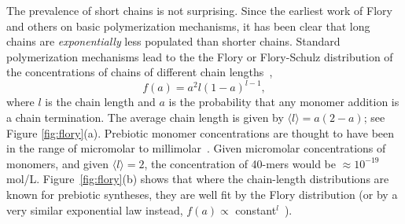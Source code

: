 \documentclass[5p,times]{elsarticle}
\begin{document}
The prevalence of short chains is not surprising.  Since the earliest work of Flory and others 
on basic polymerization mechanisms, it has been clear that long chains are \textit{exponentially} 
less populated than shorter chains.  
Standard polymerization mechanisms lead to the the Flory or Flory-Schulz distribution of the 
concentrations of chains of different chain lengths~\cite{Flory1953}, 
\begin{equation}
 f(a)=a^2l(1-a)^{l-1},\label{eq:flory}
\end{equation} 
where $l$ is the chain length and $a$ is the probability that any monomer addition is a chain 
termination.  The average chain length is given by $\langle l \rangle = a(2- a)$; see Figure 
\ref{fig:flory}(a).  Prebiotic monomer concentrations are thought to have been in the range of 
micromolar to millimolar~\cite{Stribling1987,Huber1998,Aubrey2009,Kanavarioti2001,Lazcano1996}.  
Given micromolar concentrations of monomers, and given $\langle l \rangle = 2$, the concentration 
of 40-mers would be $\approx 10^{-19} $ mol/L.  Figure~\ref{fig:flory}(b) shows that where the 
chain-length distributions are known for prebiotic syntheses, they are well fit by the Flory 
distribution (or by a very similar exponential law instead, $f(a)\propto$ 
constant$^l$~\cite{nowak2008prevolutionary,Derr2012}).
\end{document}
